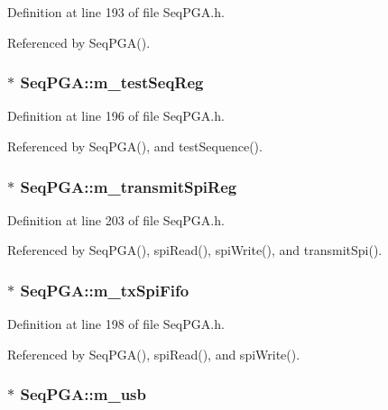 Definition at line 193 of file SeqPGA.h.

Referenced by SeqPGA().\hypertarget{classSeqPGA_a7478537516c951a4d08f23b0789ed6d9}{
\subsubsection[{m\_\-testSeqReg}]{$\ast$ {\bf SeqPGA::m\_\-testSeqReg}}}
\label{classSeqPGA_a7478537516c951a4d08f23b0789ed6d9}


Definition at line 196 of file SeqPGA.h.

Referenced by SeqPGA(), and testSequence().\hypertarget{classSeqPGA_a4e0ffb37b1cd947d389354ac25723ab8}{
\subsubsection[{m\_\-transmitSpiReg}]{$\ast$ {\bf SeqPGA::m\_\-transmitSpiReg}}}
\label{classSeqPGA_a4e0ffb37b1cd947d389354ac25723ab8}


Definition at line 203 of file SeqPGA.h.

Referenced by SeqPGA(), spiRead(), spiWrite(), and transmitSpi().\hypertarget{classSeqPGA_a6fbdd81928bb5d0fcd671ae2facaef11}{
\subsubsection[{m\_\-txSpiFifo}]{$\ast$ {\bf SeqPGA::m\_\-txSpiFifo}}}
\label{classSeqPGA_a6fbdd81928bb5d0fcd671ae2facaef11}


Definition at line 198 of file SeqPGA.h.

Referenced by SeqPGA(), spiRead(), and spiWrite().\hypertarget{classSeqPGA_a3df81bbe0e75a1287aa6fe9d33ea27f5}{
\subsubsection[{m\_\-usb}]{$\ast$ {\bf SeqPGA::m\_\-usb}}}
\label{classSeqPGA_a3df81bbe0e75a1287aa6fe9d33ea27f5}


